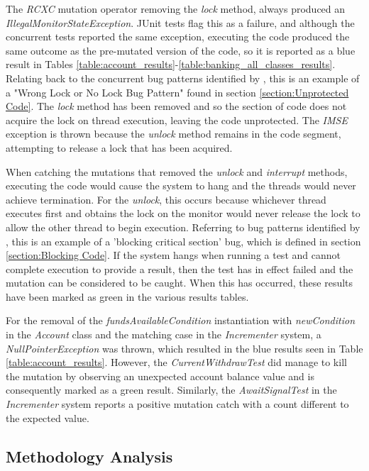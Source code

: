 \documentclass[a4paper,12pt]{article}
\begin{document}
The \textit{RCXC} mutation operator removing the \textit{lock} method, always produced an \textit{IllegalMonitorStateException}. JUnit tests flag this as a failure, and although the concurrent tests reported the same exception, executing the code produced the same outcome as the pre-mutated version of the code, so it is reported as a blue result in Tables \ref{table:account_results}-\ref{table:banking_all_classes_results}. Relating back to the concurrent bug patterns identified by \citet{farchi03}, this is an example of a "Wrong Lock or No Lock Bug Pattern" found in section \ref{section:Unprotected Code}. The \textit{lock} method has been removed and so the section of code does not acquire the lock on thread execution, leaving the code unprotected. The \textit{IMSE} exception is thrown because the \textit{unlock} method remains in the code segment, attempting to release a lock that has been acquired. 

When catching the mutations that removed the \textit{unlock} and \textit{interrupt} methods, executing the code would cause the system to hang and the threads would never achieve termination. For the \textit{unlock}, this occurs because whichever thread executes first and obtains the lock on the monitor would never release the lock to allow the other thread to begin execution. Referring to bug patterns identified by \citet{bradbury06}, this is an example of a 'blocking critical section' bug, which is defined in section \ref{section:Blocking Code}. If the system hangs when running a test and cannot complete execution to provide a result, then the test has in effect failed and the mutation can be considered to be caught. When this has occurred, these results have been marked as green in the various results tables.  

For the removal of the \textit{fundsAvailableCondition} instantiation with \textit{newCondition} in the \textit{Account} class and the matching case in the \textit{Incrementer} system, a \textit{NullPointerException} was thrown, which resulted in the blue results seen in Table \ref{table:account_results}. However, the \textit{CurrentWithdrawTest} did manage to kill the mutation by observing an unexpected account balance value and is consequently marked as a green result. Similarly, the \textit{AwaitSignalTest} in the \textit{Incrementer} system reports a positive mutation catch with a count different to the expected value.


\subsection{Methodology Analysis}
\end{document}
